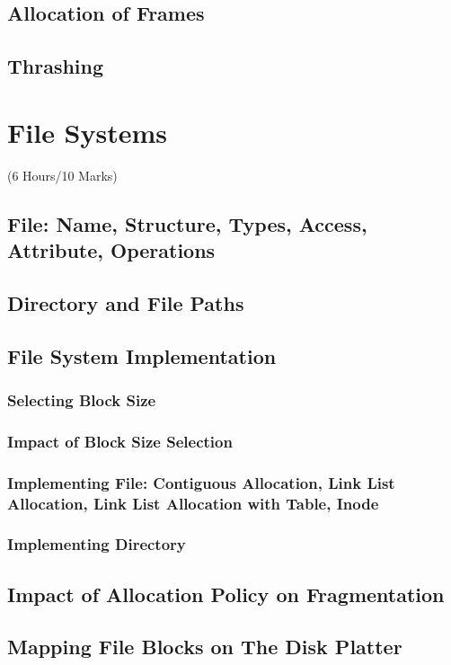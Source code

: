 \documentclass[12pt]{article}
\begin{document}
\subsection{Allocation of Frames}
\subsection{Thrashing}

\pagebreak
\section{File Systems}
\begin{center}(6 Hours/10 Marks)\end{center}
\subsection{File: Name, Structure, Types, Access, Attribute, Operations}
\subsection{Directory and File Paths}
\subsection{File System Implementation}
\subsubsection{Selecting Block Size}
\subsubsection{Impact of Block Size Selection}
\subsubsection{Implementing File: Contiguous Allocation, Link List Allocation, Link List Allocation with Table, Inode}
\subsubsection{Implementing Directory}
\subsection{Impact of Allocation Policy on Fragmentation}
\subsection{Mapping File Blocks on The Disk Platter}
\end{document}

